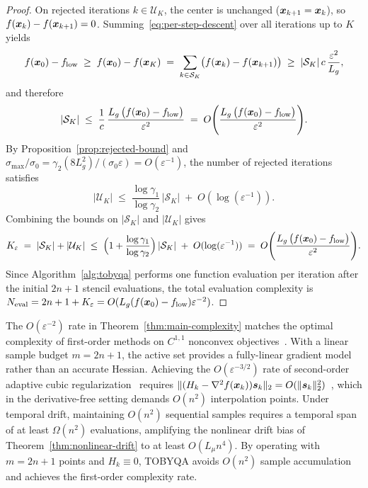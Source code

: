 \begin{proof}
On rejected iterations $k \in \mathcal{U}_K$, the center is unchanged ($\boldsymbol{x}_{k+1} = \boldsymbol{x}_k$), so $f(\boldsymbol{x}_k) - f(\boldsymbol{x}_{k+1}) = 0$. Summing~\eqref{eq:per-step-descent} over all iterations up to $K$ yields
\[
  f(\boldsymbol{x}_0) - f_{\mathrm{low}}
  \;\ge\; f(\boldsymbol{x}_0) - f(\boldsymbol{x}_K)
  \;=\; \sum_{k \in \mathcal{S}_K} \bigl(f(\boldsymbol{x}_k) - f(\boldsymbol{x}_{k+1})\bigr)
  \;\ge\; |\mathcal{S}_K|\,c\,\frac{\varepsilon^2}{L_g},
\]
and therefore
\begin{equation*}
  |\mathcal{S}_K| \;\le\; \frac{1}{c}\,\frac{L_g\,\bigl(f(\boldsymbol{x}_0) - f_{\mathrm{low}}\bigr)}{\varepsilon^2}
  \;=\; O\Biggl(\frac{L_g\,\bigl(f(\boldsymbol{x}_0) - f_{\mathrm{low}}\bigr)}{\varepsilon^2}\Biggr).
\end{equation*}
By Proposition~\ref{prop:rejected-bound} and $\sigma_{\max}/\sigma_0 = \gamma_2 (8L_g^2)/(\sigma_0\varepsilon) = O(\varepsilon^{-1})$, the number of rejected iterations satisfies
\[
  |\mathcal{U}_K| \;\le\; \frac{\log \gamma_1}{\log \gamma_2}\,|\mathcal{S}_K| \;+\; O(\log(\varepsilon^{-1})).
\]
Combining the bounds on $|\mathcal{S}_K|$ and $|\mathcal{U}_K|$ gives
\[
  K_\varepsilon \;=\; |\mathcal{S}_K| + |\mathcal{U}_K| \;\le\; \Bigl(1 + \frac{\log \gamma_1}{\log \gamma_2}\Bigr)\,|\mathcal{S}_K| \;+\; O(\log(\varepsilon^{-1})) \;=\; O\Biggl(\frac{L_g\,\bigl(f(\boldsymbol{x}_0) - f_{\mathrm{low}}\bigr)}{\varepsilon^2}\Biggr).
\]
Since Algorithm~\ref{alg:tobyqa} performs one function evaluation per iteration after the initial $2n+1$ stencil evaluations, the total evaluation complexity is $N_{\mathrm{eval}} = 2n + 1 + K_\varepsilon = O(L_g(f(\boldsymbol{x}_0) - f_{\mathrm{low}})\varepsilon^{-2})$.
\end{proof}

\begin{remark}
\label{rem:optimality}
The $O(\varepsilon^{-2})$ rate in Theorem~\ref{thm:main-complexity} matches the optimal complexity of first-order methods on $C^{1,1}$ nonconvex objectives~\cite{CarmonDuchiHinderSidford2020}. With a linear sample budget $m=2n+1$, the active set provides a fully-linear gradient model rather than an accurate Hessian. Achieving the $O(\varepsilon^{-3/2})$ rate of second-order adaptive cubic regularization~\cite{NesterovPolyak2006,CartisGouldToint2011ARC,CartisGouldToint2011ARC2} requires $\|(H_k-\nabla^2f(\boldsymbol{x}_k))\boldsymbol{s}_k\|_2=O(\|\boldsymbol{s}_k\|_2^2)$~\cite[AM.4]{CartisGouldToint2011ARC}, which in the derivative-free setting demands $O(n^2)$ interpolation points. Under temporal drift, maintaining $O(n^2)$ sequential samples requires a temporal span of at least $\Omega(n^2)$ evaluations, amplifying the nonlinear drift bias of Theorem~\ref{thm:nonlinear-drift} to at least $O(L_\mu n^4)$. By operating with $m=2n+1$ points and $H_k \equiv 0$, TOBYQA avoids $O(n^2)$ sample accumulation and achieves the first-order complexity rate.
\end{remark}



